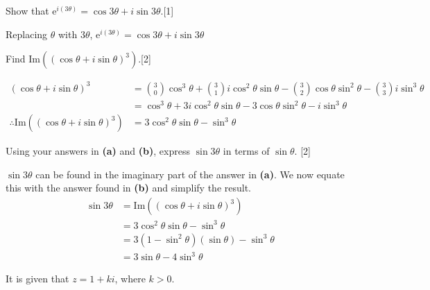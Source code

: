 \documentclass[12pt, a4 paper]{article}
\begin{document}
\begin{outline}[enumerate]
	\2 Show that $\mathrm{e}^{i(3\theta)}=\cos{3\theta}+i\sin{3\theta}$.\hfill[1]
	\begin{answer}
		Replacing $\theta$ with $3\theta$, $\mathrm{e}^{i(3\theta)}=\cos{3\theta}+i\sin{3\theta}$
	\end{answer}
	\2 Find $\textrm{Im}((\cos{\theta}+i\sin{\theta})^3)$.\hfill[2]
	\begin{answer}
		\begin{align*}
			(\cos{\theta}+i\sin{\theta})^3                         & = \binom{3}{0}\cos^3{\theta}+\binom{3}{1}i\cos^2{\theta}\sin{\theta}-\binom{3}{2}\cos{\theta}\sin^2{\theta}-\binom{3}{3}i\sin^3{\theta} \\
			                                                       & = \cos^3{\theta}+3i\cos^2{\theta}\sin{\theta}-3\cos{\theta}\sin^2{\theta}-i\sin^3{\theta}                                               \\
			\therefore \textrm{Im}((\cos{\theta}+i\sin{\theta})^3) & =3\cos^2{\theta}\sin{\theta}-\sin^3{\theta}
		\end{align*}
	\end{answer}
	\2 Using your answers in \textbf{(a)} and \textbf{(b)}, express $\sin{3\theta}$ in terms of $\sin{\theta}$. \hfill[2]
	\begin{answer}
		$\sin{3\theta}$ can be found in the imaginary part of the answer in \textbf{(a)}. We now equate this with the answer found in \textbf{(b)} and simplify the result.
		\begin{align*}
			\sin{3\theta} & = \textrm{Im}((\cos{\theta}+i\sin{\theta})^3)      \\
			              & = 3\cos^2{\theta}\sin{\theta}-\sin^3{\theta}       \\
			              & = 3(1-\sin^2{\theta})(\sin{\theta})-\sin^3{\theta} \\
			              & = 3\sin{\theta}-4\sin^3{\theta}
		\end{align*}
	\end{answer}
	\1 It is given that $z=1+ki$, where $k>0$. %


\end{outline}
\end{document}
